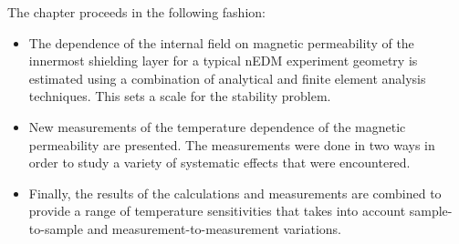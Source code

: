 





The chapter proceeds in the following fashion:
\begin{itemize}
\item The dependence of the internal field on magnetic permeability of
  the innermost shielding layer for a typical nEDM experiment geometry
  is estimated using a combination of analytical and finite element
  analysis techniques.  This sets a scale for the stability problem.
\item New measurements of the temperature dependence of the magnetic
  permeability are presented.  The measurements were done in two ways
  in order to study a variety of systematic effects that were
  encountered.
\item Finally, the results of the calculations and measurements are
  combined to provide a range of temperature sensitivities that takes
  into account sample-to-sample and measurement-to-measurement
  variations.
\end{itemize}

